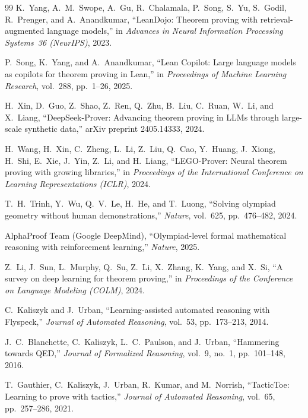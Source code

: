 \documentclass[11pt]{article}
\theoremstyle{definition}
\theoremstyle{remark}
\begin{document}
\begin{thebibliography}{99}
K.~Yang, A.~M.~Swope, A.~Gu, R.~Chalamala, P.~Song, S.~Yu,
S.~Godil, R.~Prenger, and A.~Anandkumar,
``LeanDojo: Theorem proving with retrieval-augmented language
models,''
in \emph{Advances in Neural Information Processing Systems~36
(NeurIPS)}, 2023.

P.~Song, K.~Yang, and A.~Anandkumar,
``Lean Copilot: Large language models as copilots for theorem
proving in Lean,''
in \emph{Proceedings of Machine Learning Research}, vol.~288,
pp.~1--26, 2025.

H.~Xin, D.~Guo, Z.~Shao, Z.~Ren, Q.~Zhu, B.~Liu, C.~Ruan,
W.~Li, and X.~Liang,
``DeepSeek-Prover: Advancing theorem proving in LLMs through
large-scale synthetic data,''
arXiv preprint 2405.14333, 2024.

H.~Wang, H.~Xin, C.~Zheng, L.~Li, Z.~Liu, Q.~Cao, Y.~Huang,
J.~Xiong, H.~Shi, E.~Xie, J.~Yin, Z.~Li, and H.~Liang,
``LEGO-Prover: Neural theorem proving with growing libraries,''
in \emph{Proceedings of the International Conference on Learning
Representations (ICLR)}, 2024.

T.~H.~Trinh, Y.~Wu, Q.~V.~Le, H.~He, and T.~Luong,
``Solving olympiad geometry without human demonstrations,''
\emph{Nature}, vol.~625, pp.~476--482, 2024.

AlphaProof Team (Google DeepMind),
``Olympiad-level formal mathematical reasoning with reinforcement
learning,''
\emph{Nature}, 2025.

Z.~Li, J.~Sun, L.~Murphy, Q.~Su, Z.~Li, X.~Zhang, K.~Yang,
and X.~Si,
``A survey on deep learning for theorem proving,''
in \emph{Proceedings of the Conference on Language Modeling
(COLM)}, 2024.

C.~Kaliszyk and J.~Urban,
``Learning-assisted automated reasoning with Flyspeck,''
\emph{Journal of Automated Reasoning}, vol.~53, pp.~173--213,
2014.

J.~C.~Blanchette, C.~Kaliszyk, L.~C.~Paulson, and J.~Urban,
``Hammering towards QED,''
\emph{Journal of Formalized Reasoning}, vol.~9, no.~1,
pp.~101--148, 2016.

T.~Gauthier, C.~Kaliszyk, J.~Urban, R.~Kumar, and M.~Norrish,
``TacticToe: Learning to prove with tactics,''
\emph{Journal of Automated Reasoning}, vol.~65, pp.~257--286,
2021.


\end{thebibliography}
\end{document}
